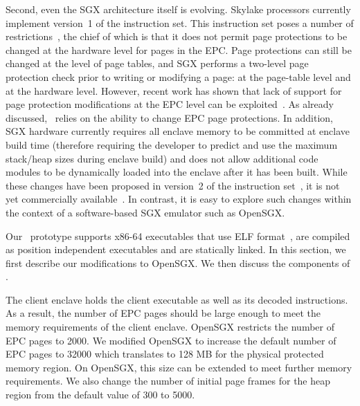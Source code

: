 Second, even the SGX architecture itself is evolving. Skylake processors
currently implement version~1 of the instruction set. This instruction set
poses a number of restrictions~\cite{dynmgmt:hasp16,dynalloc:hasp16}, the chief
of which is that it does not permit page protections to be changed at the
hardware level for pages in the EPC. Page protections can still be changed at
the level of page tables, and SGX performs a two-level page protection check
prior to writing or modifying a page: at the page-table level and at the
hardware level. However, recent work has shown that lack of support for page
protection modifications at the EPC level can be
exploited~\cite{asyncshock:esorics16}. As already discussed, \tool\ relies on
the ability to change EPC page protections. In addition, SGX hardware currently
requires all enclave memory to be committed at enclave build time (therefore
requiring the developer to predict and use the maximum stack/heap sizes during
enclave build) and does not allow additional code modules to be dynamically
loaded into the enclave after it has been built.  While these changes have been
proposed in version~2 of the instruction
set~\cite{dynmgmt:hasp16,dynalloc:hasp16}, it is not yet commercially
available~\cite{sgx:v2:na}. In contrast, it is easy to explore such changes
within the context of a software-based SGX emulator such as OpenSGX.





Our \tool\ prototype supports x86-64 executables that use ELF
format~\cite{elfsharedlib, elfsystemV}, are compiled as position independent
executables and are statically linked.  In this section, we first describe our
modifications to OpenSGX. We then discuss the components of \tool.

 The client enclave holds the client
executable as well as its decoded instructions. As a result, the number of EPC
pages should be large enough to meet the memory requirements of the client
enclave. OpenSGX restricts the number of EPC pages to 2000. We modified OpenSGX
to increase the default number of EPC pages to 32000 which translates to 128 MB
for the physical protected memory region. On OpenSGX, this size can be extended
to meet further memory requirements. We also change the number of initial page
frames for the heap region from the default value of 300 to 5000.

